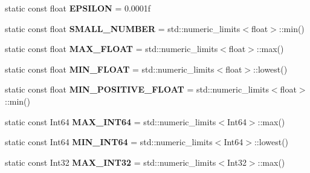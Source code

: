 \begin{DoxyCompactItemize}
\mbox{\label{structdrider_s_d_k_1_1_math_ae959011f458595ab4cbcd33bfc86f3dc}} 
static const float {\bfseries E\+P\+S\+I\+L\+ON} = 0.\+0001f
\item 
\mbox{\label{structdrider_s_d_k_1_1_math_ab16b1c03c326a2fc6b60fac9c72965b1}} 
static const float {\bfseries S\+M\+A\+L\+L\+\_\+\+N\+U\+M\+B\+ER} = std\+::numeric\+\_\+limits$<$float$>$\+::min()
\item 
\mbox{\label{structdrider_s_d_k_1_1_math_add5cde21e7161c0ba94fa915dc0b9dcd}} 
static const float {\bfseries M\+A\+X\+\_\+\+F\+L\+O\+AT} = std\+::numeric\+\_\+limits$<$float$>$\+::max()
\item 
\mbox{\label{structdrider_s_d_k_1_1_math_acf8a1c8a5cebbcf173f8d78a10039eb9}} 
static const float {\bfseries M\+I\+N\+\_\+\+F\+L\+O\+AT} = std\+::numeric\+\_\+limits$<$float$>$\+::lowest()
\item 
\mbox{\label{structdrider_s_d_k_1_1_math_a8fb19b3d9283a8b0bd5007000d45f770}} 
static const float {\bfseries M\+I\+N\+\_\+\+P\+O\+S\+I\+T\+I\+V\+E\+\_\+\+F\+L\+O\+AT} = std\+::numeric\+\_\+limits$<$float$>$\+::min()
\item 
\mbox{\label{structdrider_s_d_k_1_1_math_a507ff821be2ec8e973faf40849d1f711}} 
static const Int64 {\bfseries M\+A\+X\+\_\+\+I\+N\+T64} = std\+::numeric\+\_\+limits$<$Int64$>$\+::max()
\item 
\mbox{\label{structdrider_s_d_k_1_1_math_ac15c74a1d778bbf64bb476c22801364b}} 
static const Int64 {\bfseries M\+I\+N\+\_\+\+I\+N\+T64} = std\+::numeric\+\_\+limits$<$Int64$>$\+::lowest()
\item 
\mbox{\label{structdrider_s_d_k_1_1_math_a4d360a57d6ceaa3e2c53fea682dc7752}} 
static const Int32 {\bfseries M\+A\+X\+\_\+\+I\+N\+T32} = std\+::numeric\+\_\+limits$<$Int32$>$\+::max()
\item 
\mbox{\label{structdrider_s_d_k_1_1_math_a6693664d98231be88edbdec0661b53bc}} 

\end{DoxyCompactItemize}
